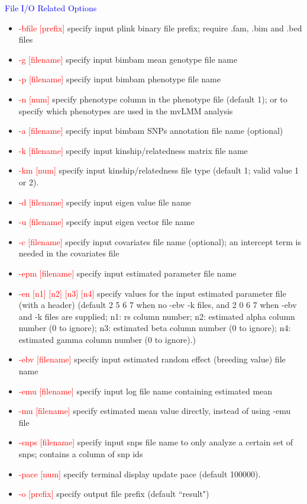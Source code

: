 \documentclass[11pt]{article}
\begin{document}
\textcolor{blue}{File I/O Related Options}
%
\begin{itemize}
\item \textcolor{red}{-bfile    [prefix]}          \quad specify input plink binary file prefix; require .fam, .bim and .bed files
\item \textcolor{red}{-g        [filename]}      \quad specify input bimbam mean genotype file name
\item  \textcolor{red}{-p        [filename]}      \quad specify input bimbam phenotype file name
\item  \textcolor{red}{-n        [num]}      \quad specify phenotype column in the phenotype file (default 1); or to specify which phenotypes are used in the mvLMM analysis
\item  \textcolor{red}{-a        [filename]}      \quad specify input bimbam SNPs annotation file name (optional)
\item  \textcolor{red}{ -k        [filename]}     \quad  specify input kinship/relatedness matrix file name
\item  \textcolor{red}{ -km       [num]}     \quad           specify input kinship/relatedness file type (default 1; valid value 1 or 2).
\item  \textcolor{red}{ -d        [filename]}     \quad  specify input eigen value file name
\item  \textcolor{red}{ -u        [filename]}     \quad  specify input eigen vector file name
\item  \textcolor{red}{ -c        [filename] }     \quad      specify input covariates file name (optional); an intercept term is needed in the covariates file
\item  \textcolor{red}{ -epm        [filename] }     \quad    specify input estimated parameter file name
\item  \textcolor{red}{ -en [n1]  [n2]  [n3]  [n4]}     \quad    specify values for the input estimated parameter file (with a header) (default 2 5 6 7 when no -ebv -k files, and 2 0 6 7 when -ebv and -k files are supplied; n1: rs column number; n2: estimated alpha column number (0 to ignore); n3: estimated beta column number (0 to ignore); n4: estimated gamma column number (0 to ignore).)
\item  \textcolor{red}{ -ebv        [filename] }     \quad    specify input estimated random effect (breeding value) file name
\item  \textcolor{red}{ -emu        [filename] }     \quad    specify input log file name containing estimated mean
\item  \textcolor{red}{ -mu        [filename] }     \quad    specify estimated mean value directly, instead of using -emu file
\item  \textcolor{red}{ -snps        [filename] }     \quad    specify input snps file name to only analyze a certain set of snps; contains a column of snp ids
\item  \textcolor{red}{ -pace     [num]}     \quad           specify terminal display update pace (default 100000).
\item  \textcolor{red}{ -o        [prefix]}     \quad        specify output file prefix (default ``result")
\end{itemize}
\end{document}

